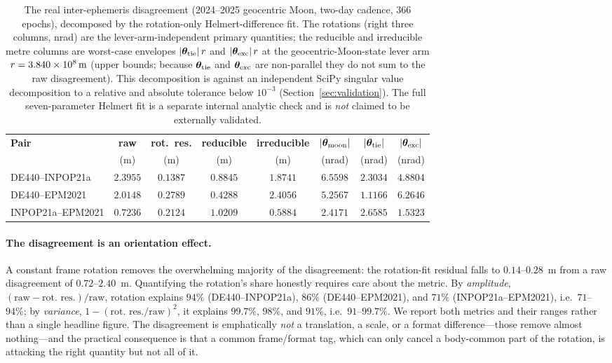 \begin{table}[t]
\centering
\caption{The real inter-ephemeris disagreement (2024--2025 geocentric Moon,
two-day cadence, $366$ epochs), decomposed by the rotation-only Helmert-difference
fit. The rotations (right three columns, nrad) are the lever-arm-independent primary
quantities; the reducible and irreducible metre columns are worst-case envelopes
$|\bm{\theta}_{\mathrm{tie}}|\,r$ and $|\bm{\theta}_{\mathrm{exc}}|\,r$ at the
geocentric-Moon-state lever arm $r=\SI{3.840e8}{m}$ (upper bounds; because
$\bm{\theta}_{\mathrm{tie}}$ and $\bm{\theta}_{\mathrm{exc}}$ are non-parallel they do not sum to the
raw disagreement). This decomposition is \Validated{} against an independent
SciPy singular value decomposition to a relative and absolute tolerance below
$10^{-3}$ (Section~\ref{sec:validation}). The full seven-parameter Helmert fit is a
separate internal analytic check and is \emph{not} claimed to be externally
validated.}
\label{tab:anchor}
\small
\begin{tabular}{@{}lccccccc@{}}
\toprule
\textbf{Pair} & \textbf{raw} & \textbf{rot.\ res.} &
\textbf{reducible} & \textbf{irreducible} &
$|\bm{\theta}_{\mathrm{moon}}|$ & $|\bm{\theta}_{\mathrm{tie}}|$ & $|\bm{\theta}_{\mathrm{exc}}|$ \\
 & (m) & (m) & (m) & (m) & (nrad) & (nrad) & (nrad) \\
\midrule
DE440--INPOP21a   & $2.3955$ & $0.1387$ & $0.8845$ & $1.8741$ & $6.5598$ & $2.3034$ & $4.8804$ \\
DE440--EPM2021    & $2.0148$ & $0.2789$ & $0.4288$ & $2.4056$ & $5.2567$ & $1.1166$ & $6.2646$ \\
INPOP21a--EPM2021 & $0.7236$ & $0.2124$ & $1.0209$ & $0.5884$ & $2.4171$ & $2.6585$ & $1.5323$ \\
\bottomrule
\end{tabular}
\end{table}

\paragraph{The disagreement is an orientation effect.}
A constant frame rotation removes the overwhelming majority of the disagreement: the
rotation-fit residual falls to $0.14$--$0.28$~m from a raw disagreement of
$0.72$--$2.40$~m. Quantifying the rotation's share honestly requires care about the
metric. By \emph{amplitude}, $(\text{raw}-\text{rot.\ res.})/\text{raw}$, rotation
explains $94\%$ (DE440--INPOP21a), $86\%$ (DE440--EPM2021), and $71\%$
(INPOP21a--EPM2021), i.e.\ $71$--$94\%$; by \emph{variance},
$1-(\text{rot.\ res.}/\text{raw})^2$, it explains $99.7\%$, $98\%$, and $91\%$,
i.e.\ $91$--$99.7\%$. We report both metrics and their ranges rather than a single
headline figure. The disagreement is emphatically \emph{not} a translation, a scale,
or a format difference---those remove almost nothing---and the practical consequence
is that a common frame/format tag, which can only cancel a body-common part of the
rotation, is attacking the right quantity but not all of it.


